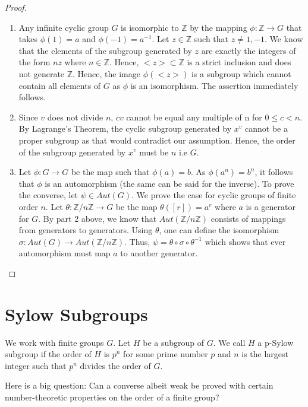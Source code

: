 \documentclass[12pt]{article}
\begin{document}
\begin{proof}
\begin{enumerate}
\item Any infinite cyclic group $G$ is isomorphic to $\mathbb{Z}$ by the mapping $\phi: \mathbb{Z} \rightarrow G$ that takes $\phi(1) = a$ and $\phi(-1) = a^{-1}$. Let $z \in \mathbb{Z}$ such that $z \neq 1,-1$. We know that the elements of the  subgroup generated by $z$ are exactly the integers of the form $nz$ where $n \in \mathbb{Z}$. Hence, $<z> \subset \mathbb{Z}$ is a strict inclusion and does not generate $\mathbb{Z}$. Hence, the image $\phi(<z>)$ is a subgroup which cannot contain all elements of $G$ as $\phi$ is an isomorphism. The assertion immediately follows.

\item  Since $v$ does not divide $n$,  $cv$ cannot be equal any multiple of n for $ 0 \leq c < n$. By Lagrange's Theorem, the cyclic subgroup generated by $x^v$ cannot be a proper subgroup as that would contradict our assumption. Hence, the order of the subgroup generated by $x^v$ must be $n$ i.e $G$.

\item Let $\phi: G \rightarrow G$ be the map such that $\phi(a) = b$. As $\phi(a^n) = b^n$, it follows that $\phi$ is an automorphism (the same can be said for the inverse). To prove the converse, let $\psi \in Aut(G)$. We prove the case for cyclic groups of finite order $n$. Let $\theta: \mathbb{Z}/n\mathbb{Z} \rightarrow G$ be the map $\theta([r]) = a^r$ where $a$ is a generator for $G$. By part 2 above, we know that $Aut(\mathbb{Z}/n\mathbb{Z})$ consists of mappings from generators to generators. Using $\theta$, one can define the isomorphism $\sigma:  Aut(G) \rightarrow Aut(\mathbb{Z}/n\mathbb{Z})$. Thus, 
$\psi = \theta \circ \sigma \circ \theta^{-1}$ which shows that ever automorphism must map $a$ to another generator. 
\end{enumerate}
\end{proof}



\section*{Sylow Subgroups}

We work with finite groups $G$. Let $H$ be a subgroup of $G$. We call $H$ a p-Sylow subgroup if the order of $H$ is $p^n$ for some prime number $p$ and $n$ is the largest integer such that $p^n$ divides the order of $G$. 
\par Here is a big question: Can a converse albeit weak be proved with certain number-theoretic properties on the order of a finite group?
\end{document}
